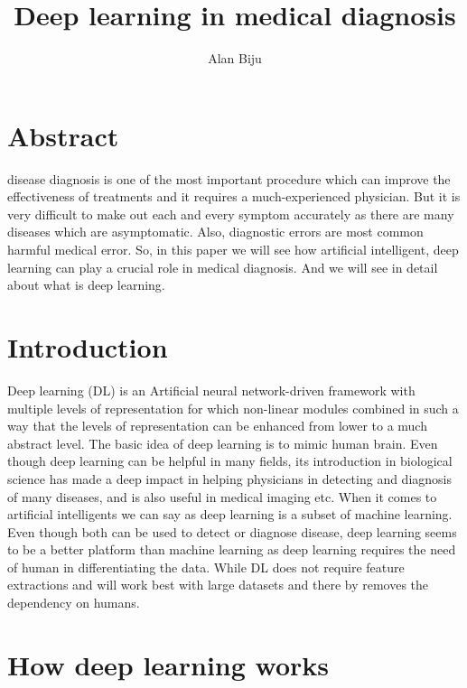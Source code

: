 \documentclass{article,17 pt}
\begin{document}
\title{Deep learning in medical diagnosis }
\author{Alan Biju}


\maketitle


\section*{Abstract}

disease diagnosis is one of the most important procedure which can improve the effectiveness of treatments and it requires a much-experienced physician. But it is very difficult to make out each and every symptom accurately as there are many diseases which are asymptomatic. Also, diagnostic errors are most common harmful medical error. So, in this paper we will see how artificial intelligent, deep learning can play a crucial role in medical diagnosis. And we will see in detail about what is deep learning. 



\section*{Introduction}


Deep learning (DL) is an Artificial neural network-driven framework with multiple levels of representation for which non-linear modules combined in such a way that the levels of representation can be enhanced from lower to a much abstract level. The basic idea of deep learning is to mimic human brain. Even though deep learning can be helpful in many fields, its introduction in biological science has made a deep impact in helping physicians in detecting and diagnosis of many diseases, and is also useful in medical imaging etc. When it comes to artificial intelligents we can say as deep learning is a subset of machine learning. Even though both can be used to detect or diagnose disease, deep learning seems to be a better platform than machine learning as deep learning requires the need of human in differentiating the data. While DL does not require feature extractions and will work best with large datasets and there by removes the dependency on humans. 


 \section* {How deep learning works }
\end{document}
